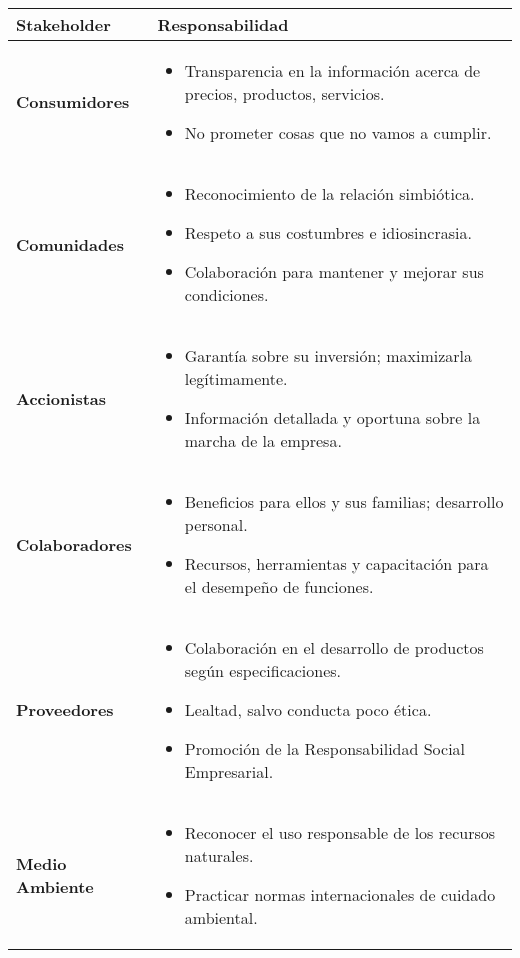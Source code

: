 \documentclass[a4paber,12pt]{article}
\begin{document}
	\begin{longtable}{>{\raggedright\arraybackslash}p{4cm} >{\raggedright\arraybackslash}p{11cm}}
		\toprule
		\textbf{Stakeholder} & \textbf{Responsabilidad} \\
		\midrule
		\textbf{Consumidores} & 
		\begin{itemize}
			\item Transparencia en la información acerca de precios, productos, servicios.
			\item No prometer cosas que no vamos a cumplir.
		\end{itemize} \\
		
		\textbf{Comunidades} & 
		\begin{itemize}
			\item Reconocimiento de la relación simbiótica.
			\item Respeto a sus costumbres e idiosincrasia.
			\item Colaboración para mantener y mejorar sus condiciones.
		\end{itemize} \\
		
		\textbf{Accionistas} & 
		\begin{itemize}
			\item Garantía sobre su inversión; maximizarla legítimamente.
			\item Información detallada y oportuna sobre la marcha de la empresa.
		\end{itemize} \\
		
		\textbf{Colaboradores} & 
		\begin{itemize}
			\item Beneficios para ellos y sus familias; desarrollo personal.
			\item Recursos, herramientas y capacitación para el desempeño de funciones.
		\end{itemize} \\
		
		\textbf{Proveedores} & 
		\begin{itemize}
			\item Colaboración en el desarrollo de productos según especificaciones.
			\item Lealtad, salvo conducta poco ética.
			\item Promoción de la Responsabilidad Social Empresarial.
		\end{itemize} \\
		
		\textbf{Medio Ambiente} & 
		\begin{itemize}
			\item Reconocer el uso responsable de los recursos naturales.
			\item Practicar normas internacionales de cuidado ambiental.
		\end{itemize} \\
		\bottomrule
	\end{longtable}
	
\end{document}
